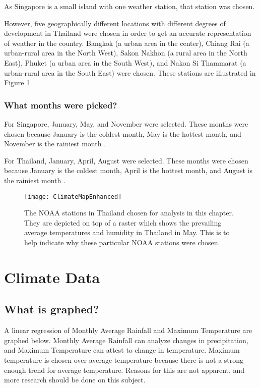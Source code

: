 As Singapore is a small island with one weather station, that station was chosen. 

However, five geographically different locations with different degrees of development in Thailand were chosen in order to get an accurate representation of weather in the country. Bangkok (a urban area in the center), Chiang Rai (a urban-rural area in the North West), Sakon Nakhon (a rural area in the North East), Phuket (a urban area in the South West), and Nakon Si Thammarat (a urban-rural area in the South East) were chosen. These stations are illustrated in Figure \ref{fig:stationsmap}

\subsubsection{What months were picked?}

For Singapore, January, May, and November were selected. These months were chosen because January is the coldest month, May is the hottest month, and November is the rainiest month \citep{singaporeweather}. 

For Thailand, January, April, August were selected. These months were chosen because January is the coldest month, April is the hottest month, and August is the rainiest month \citep{thailandweather}. 

\begin{figure}
  \texttt{[image: ClimateMapEnhanced]}
  \caption{The NOAA stations in Thailand chosen for analysis in this chapter. They are depicted on top of a raster which shows the prevailing average temperatures and humidity in Thailand in May. This is to help indicate why these particular NOAA stations were chosen.}
  \label{fig:stationsmap}
\end{figure}

\section{Climate Data}

\subsection{What is graphed?}

A linear regression of Monthly Average Rainfall and Maximum Temperature are graphed below. Monthly Average Rainfall can analyze changes in precipitation, and Maximum Temperature can attest to change in temperature. Maximum temperature is chosen over average temperature because there is not a strong enough trend for average temperature. Reasons for this are not apparent, and more research should be done on this subject.  

